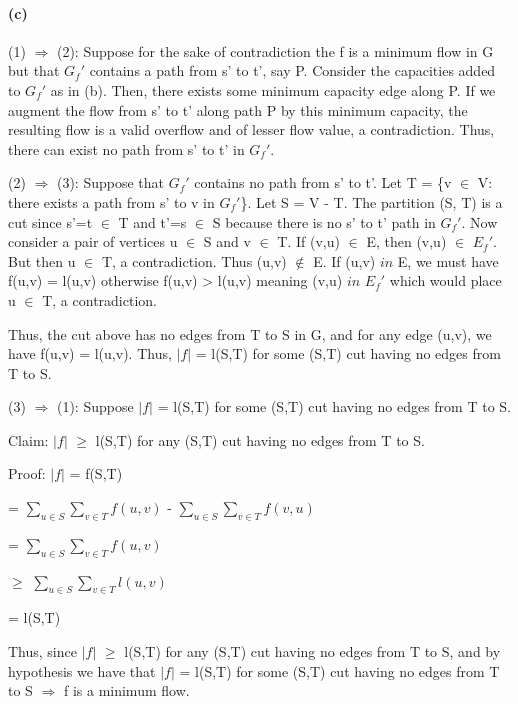 \documentclass[11pt,a4paper]{article}
\begin{document}
\paragraph*{(c)}
(1) $\Rightarrow$ (2): Suppose for the sake of contradiction the f is a minimum flow in G but that $G_{f}'$ contains a path from s' to t', say P. Consider the capacities added to $G_{f}'$ as in (b). Then, there exists some minimum capacity edge along P. If we augment the flow from s' to t' along path P by this minimum capacity, the resulting flow is a valid overflow and of lesser flow value, a contradiction. Thus, there can exist no path from s' to t' in $G_{f}'$. 

(2) $\Rightarrow$ (3): Suppose that $G_{f}'$ contains no path from s' to t'. Let T = \{v $\in$ V: there exists a path from s' to v in $G_{f}'$\}. Let S = V - T. The partition (S, T) is a cut since s'=t $\in$ T and t'=s $\in$ S because there is no s' to t' path in $G_{f}'$. Now consider a pair of vertices u $\in$ S and v $\in$ T. If (v,u) $\in$ E, then (v,u) $\in$ $E_{f}'$. But then u $\in$ T, a contradiction. Thus (u,v) $\not\in$ E. If (u,v) $in$ E, we must have f(u,v) = l(u,v) otherwise f(u,v) > l(u,v) meaning (v,u) $in$ $E_{f}'$ which would place u $\in$ T, a contradiction. 

Thus, the cut above has no edges from T to S in G, and for any edge (u,v), we have f(u,v) = l(u,v). Thus, $|f|$ = l(S,T) for some (S,T) cut having no edges from T to S.

(3) $\Rightarrow$ (1): Suppose $|f|$ = l(S,T) for some (S,T) cut having no edges from T to S. 

Claim: $|f|$ $\geq$ l(S,T) for any (S,T) cut having no edges from T to S. 

Proof: $|f|$ = f(S,T) 

= $\sum\limits_{u \in S}\sum\limits_{v \in T} f(u,v)$ - $\sum\limits_{u \in S}\sum\limits_{v \in T} f(v,u)$

= $\sum\limits_{u \in S}\sum\limits_{v \in T} f(u,v)$

$\geq$ $\sum\limits_{u \in S}\sum\limits_{v \in T} l(u,v)$

= l(S,T)


Thus, since $|f|$ $\geq$ l(S,T) for any (S,T) cut having no edges from T to S, and by hypothesis we have that $|f|$ = l(S,T) for some (S,T) cut having no edges from T to S $\Rightarrow$ f is a minimum flow.
\end{document}
